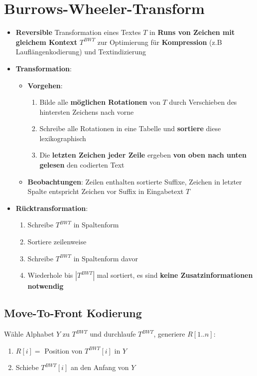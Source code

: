 \documentclass[10pt,a4paper]{article}
\begin{document}
	\newpage
	\section{Burrows-Wheeler-Transform}
	\label{bwt:sec:burrows_wheeler_transform}
	
	\begin{itemize}
		\item \textbf{Reversible} Transformation eines Textes $T$ in \textbf{Runs von Zeichen mit gleichem Kontext} $T^{BWT}$ zur Optimierung für \textbf{Kompression} (z.B Lauflängenkodierung) und Textindizierung
		\item \textbf{Transformation}:
		\begin{itemize}
			\item \textbf{Vorgehen}:
			\begin{enumerate}
				\item Bilde alle \textbf{möglichen Rotationen} von $T$ durch Verschieben des hintersten Zeichens nach vorne
				\item Schreibe alle Rotationen in eine Tabelle und \textbf{sortiere} diese lexikographisch
				\item Die \textbf{letzten Zeichen jeder Zeile} ergeben \textbf{von oben nach unten gelesen} den codierten Text
			\end{enumerate}
			\item \textbf{Beobachtungen}: Zeilen enthalten sortierte Suffixe, Zeichen in letzter Spalte entspricht Zeichen vor Suffix in Eingabetext $T$
		\end{itemize}
		\item \textbf{Rücktransformation}:
		\begin{enumerate}
			\item Schreibe $T^{BWT}$ in Spaltenform
			\item Sortiere zeilenweise
			\item Schreibe $T^{BWT}$ in Spaltenform davor
			\item Wiederhole bis $|T^{BWT}|$ mal sortiert, es sind \textbf{keine Zusatzinformationen notwendig}
		\end{enumerate}
	\end{itemize}

	\subsection{Move-To-Front Kodierung}
	\label{bwt:sub:move_to_front_kodierung}
	
	Wähle Alphabet $Y$ zu $T^{BWT}$ und durchlaufe $T^{BWT}$, generiere $R[1..n]$:
	\begin{enumerate}
		\item $R[i] = $ Position von $T^{BWT}[i]$ in $Y$
		\item Schiebe $T^{BWT}[i]$ an den Anfang von $Y$
	\end{enumerate}
\end{document}
